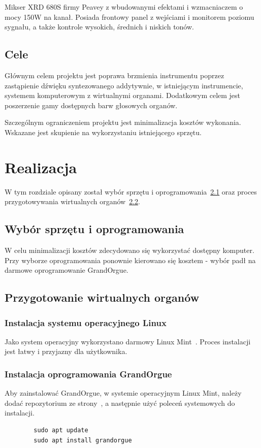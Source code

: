 \documentclass[11pt]{report}
\begin{document}
    Mikser XRD 680S firmy Peavey z wbudowanymi efektami i wzmacniaczem o mocy 150W na kanał.
    Posiada frontowy panel z wejściami i monitorem poziomu sygnału,
    a także kontrole wysokich, średnich i niskich tonów.


    \section{Cele}\label{sec:cele}
    Głównym celem projektu jest poprawa brzmienia instrumentu poprzez zastąpienie dźwięku syntezowanego addytywnie,
    w istniejącym instrumencie, systemem komputerowym z wirtualnymi organami.
    Dodatkowym celem jest poszerzenie gamy dostępnych barw głosowych organów.

    Szczególnym ograniczeniem projektu jest minimalizacja kosztów wykonania.
    Wskazane jest skupienie na wykorzystaniu istniejącego sprzętu.


    \chapter{Realizacja}
    W tym rozdziale opisany został wybór sprzętu i oprogramowania~\ref{sec:wybór-sprzętu-i-oprogramowania}
    oraz proces przygotowywania wirtualnych organów~\ref{sec:przygotowanie-wirtualnych-organów}.


    \section{Wybór sprzętu i oprogramowania}\label{sec:wybór-sprzętu-i-oprogramowania}
    W celu minimalizacji kosztów zdecydowano się wykorzystać dostępny komputer.
    Przy wyborze oprogramowania ponownie kierowano się kosztem - wybór padł na darmowe oprogramowanie GrandOrgue.


    \section{Przygotowanie wirtualnych organów}\label{sec:przygotowanie-wirtualnych-organów}

    \subsection{Instalacja systemu operacyjnego Linux}
    Jako system operacyjny wykorzystano darmowy Linux Mint~\cite{mint}.
    Proces instalacji jest łatwy i przyjazny dla użytkownika.

    \subsection{Instalacja oprogramowania GrandOrgue}
    Aby zainstalować GrandOrgue, w systemie operacyjnym Linux Mint, należy dodać repozytorium ze strony~\cite{grandorgueRepo},
    a następnie użyć poleceń systemowych do instalacji.
    \begin{verbatim}
        sudo apt update
        sudo apt install grandorgue
    \end{verbatim}
\end{document}
